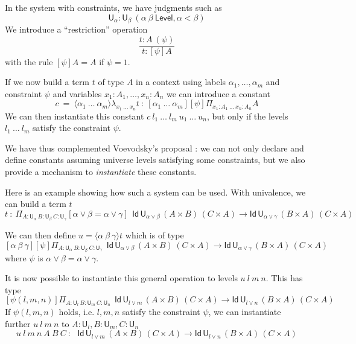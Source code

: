 \documentclass[11pt,a4paper]{article}
\theoremstyle{definition}
\newcommand{\Id}{\mathsf{Id}}
\newcommand{\lam}[2]{{\langle}#1{\rangle}#2}
\def\UU{\mathsf{U}}
\def\Level{\mathsf{Level}}
\begin{document}
In the system with constraints, we have judgments such as
$$
\UU_{\alpha}:\UU_{\beta}~(\alpha~\beta~\Level,\alpha<\beta)
$$
We introduce a ``restriction'' operation
$$
\frac{t:A~(\psi)}{t:[\psi]A}
$$
with the rule $[\psi]A = A$ if $\psi = 1$.

\medskip

If we now build a term $t$ of type $A$ in a context using labels $\alpha_1,\dots,\alpha_m$
and constraint $\psi$ and variables $x_1:A_1,\dots,x_n:A_n$ we can introduce a constant
$$
c~=~ \lam{\alpha_1~\dots~\alpha_m}\lambda_{x_1~\dots~x_n}t ~:~
[\alpha_1~\dots~\alpha_m][\psi]\Pi_{x_1:A_1~\dots~x_n:A_n}A
$$
We can then instantiate this constant $c~l_1~\dots~l_m~u_1~\dots~u_n$, but only if the levels
$l_1~\dots~l_m$ satisfy the constraint $\psi$.

    We have thus complemented Voevodsky's proposal \cite{VV}: we can not only declare and define
    constants assuming universe levels satisfying some constraints, but we also provide a mechanism
    to {\em instantiate} these constants.

    

\medskip




Here is an example showing how such a system can be used. With univalence, we can build a term $t$
$$
t~:~    \Pi_{A:\UU_\alpha~{B}:{\UU_\beta}~{C}:{\UU_\gamma}}[\alpha \vee \beta = \alpha \vee \gamma]
    {~~\Id\,\UU_{\alpha \vee \beta}\, (A\times B)\,(C \times A)
    \to \Id\,\UU_{\alpha \vee \gamma}\, (B\times A)\,(C \times A)}
$$

    We can then define $u = \lam{\alpha~\beta~\gamma}t$ which is of type
    $$[\alpha~\beta~\gamma][\psi]\Pi_{A:\UU_\alpha~{B}:{\UU_\beta}~{C}:{\UU_\gamma}}
    {~~\Id\,\UU_{\alpha \vee \beta}\, (A\times B)\,(C \times A)
    \to \Id\,\UU_{\alpha \vee \gamma}\, (B\times A)\,(C \times A)}
$$
    where $\psi$ is $\alpha \vee \beta = \alpha \vee \gamma$.

    It is now possible to instantiate this general operation to levels $u~l~m~n$. This has type
    $$[\psi(l,m,n)]\Pi_{A:\UU_l~{B}:{\UU_m}~{C}:{\UU_n}}
    {~~\Id\,\UU_{l \vee m}\, (A\times B)\,(C \times A)
    \to \Id\,\UU_{l \vee n}\, (B\times A)\,(C \times A)}
$$
    If $\psi(l,m,n)$ holds, i.e. $l,m,n$ satisfy the constraint $\psi$, we can instantiate
    further $u~l~m~n$ to $A:\UU_l,B:\UU_m,C:\UU_n$
    $$u~l~m~n~A~B~C~:~    {~~\Id\,\UU_{l \vee m}\, (A\times B)\,(C \times A)
    \to \Id\,\UU_{l \vee n}\, (B\times A)\,(C \times A)}$$
\end{document}
